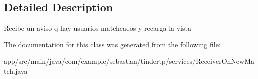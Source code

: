 \subsection{Detailed Description}
Recibe un aviso q hay usuarios matcheados y recarga la vista 

The documentation for this class was generated from the following file\+:\begin{DoxyCompactItemize}
\item 
app/src/main/java/com/example/sebastian/tindertp/services/Receiver\+On\+New\+Match.\+java\end{DoxyCompactItemize}
